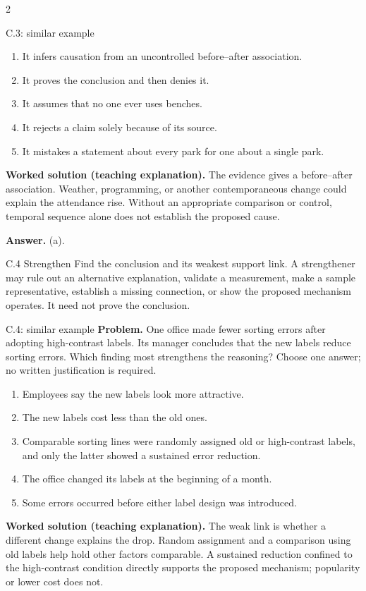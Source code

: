 \documentclass[10pt]{extarticle}
\begin{document}
\begin{multicols}{2}
\begin{workedbox}{C.3: similar example}
\begin{enumerate}[label=(\alph*)]
\item It infers causation from an uncontrolled before--after association.
\item It proves the conclusion and then denies it.
\item It assumes that no one ever uses benches.
\item It rejects a claim solely because of its source.
\item It mistakes a statement about every park for one about a single park.
\end{enumerate}
\textbf{Worked solution (teaching explanation).} The evidence gives a before--after association. Weather, programming, or another contemporaneous change could explain the attendance rise. Without an appropriate comparison or control, temporal sequence alone does not establish the proposed cause.

\textbf{Answer.} (a).
\end{workedbox}


\columnbreak
\begin{methodbox}{C.4 Strengthen}
Find the conclusion and its weakest support link. A strengthener may rule out an
alternative explanation, validate a measurement, make a sample representative,
establish a missing connection, or show the proposed mechanism operates.
It need not prove the conclusion.
\end{methodbox}

\begin{workedbox}{C.4: similar example}
\textbf{Problem.} One office made fewer sorting errors after adopting high-contrast labels. Its manager concludes that the new labels reduce sorting errors. Which finding most strengthens the reasoning? Choose one answer; no written justification is required.

\begin{enumerate}[label=(\alph*)]
\item Employees say the new labels look more attractive.
\item The new labels cost less than the old ones.
\item Comparable sorting lines were randomly assigned old or high-contrast labels, and only the latter showed a sustained error reduction.
\item The office changed its labels at the beginning of a month.
\item Some errors occurred before either label design was introduced.
\end{enumerate}
\textbf{Worked solution (teaching explanation).} The weak link is whether a different change explains the drop. Random assignment and a comparison using old labels help hold other factors comparable. A sustained reduction confined to the high-contrast condition directly supports the proposed mechanism; popularity or lower cost does not.


\end{workedbox}
\end{multicols}
\end{document}
